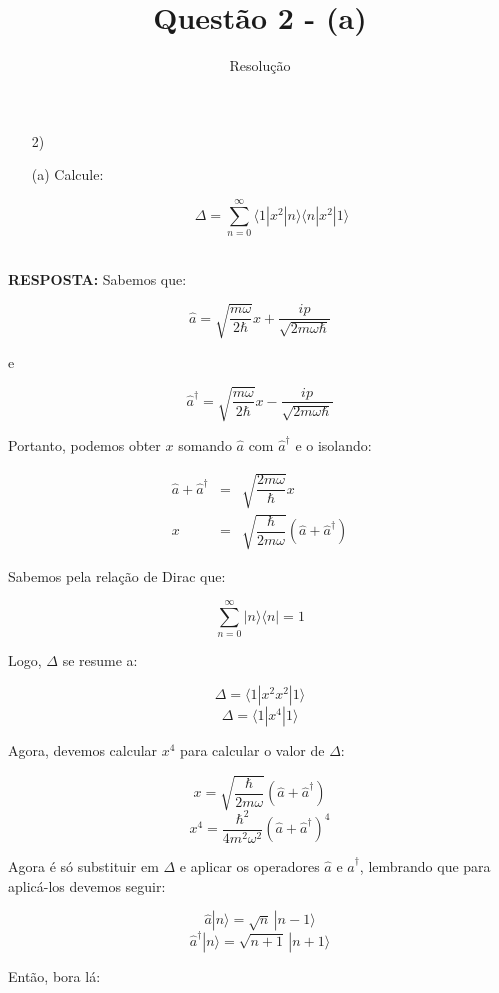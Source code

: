 \documentclass[a4paper,12pt]{article}
\title{Questão 2 - (a)}
\author{Resolução}
\newcommand{\soma}{\displaystyle\sum}
\newcommand{\eqn}{\begin{eqnarray*}}
\newcommand{\feqn}{\end{eqnarray*}}
\begin{document}
\maketitle

\begin{enumerate}

\item[2)] 

\item[(a)] Calcule:

$$\Delta = \soma_{n=0}^{\infty}\langle 1|x^2|n\rangle\langle n|x^2|1\rangle$$
\\
\end{enumerate}

\textbf{RESPOSTA:} Sabemos que:

$$\hat{a} = \sqrt{\dfrac{m\omega}{2\hbar}}x + \dfrac{ip}{\sqrt{2m\omega\hbar}}$$

e

$$\hat{a}^\dag = \sqrt{\dfrac{m\omega}{2\hbar}}x - \dfrac{ip}{\sqrt{2m\omega\hbar}}$$

Portanto, podemos obter $x$ somando $\hat{a}$ com $\hat{a}^{\dag}$ e o isolando:

\eqn
\hat{a} + \hat{a}^{\dag} &=& \sqrt{\dfrac{2m\omega}{\hbar}}x\\
x &=& \sqrt{\dfrac{\hbar}{2m\omega}}(\hat{a} + \hat{a}^{\dag})
\feqn

Sabemos pela relação de Dirac que:

$$\soma_{n=0}^{\infty} |n\rangle\langle n|= 1$$

Logo, $\Delta$ se resume a:

$$\Delta = \langle 1|x^2x^2|1\rangle$$
$$\Delta = \langle 1|x^4|1\rangle$$

Agora, devemos calcular $x^4$ para calcular o valor de $\Delta$:

$$x = \sqrt{\dfrac{\hbar}{2m\omega}}(\hat{a} + \hat{a}^\dag)$$
$$x^4 = \dfrac{\hbar^2}{4m^2\omega^2}(\hat{a} + \hat{a}^\dag)^4$$

Agora é só substituir em $\Delta$ e aplicar os operadores $\hat{a}$ e $\hat{a}^\dag$, lembrando que para aplicá-los devemos seguir:

$$\hat{a}|n\rangle = \sqrt{n}\,|n-1\rangle$$
$$\hat{a}^\dag|n\rangle = \sqrt{n+1}\,|n+1\rangle$$

Então, bora lá:
\end{document}
